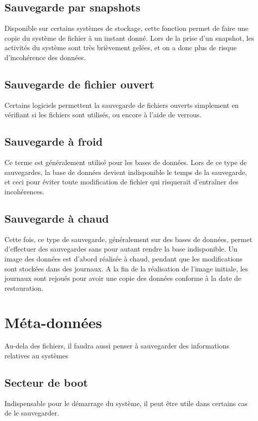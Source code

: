 \documentclass[a4paper,11pt]{report}
\begin{document}
\subsection{Sauvegarde par snapshots}
Disponible sur certains systèmes de stockage, cette fonction permet de faire une copie du système de fichier à un instant donné.
Lors de la prise d'un snapshot, les activités du système sont très brièvement gelées, et on a donc plus de risque d'incohérence des données.

\subsection{Sauvegarde de fichier ouvert}
Certains logiciels permettent la sauvegarde de fichiers ouverts simplement en vérifiant si les fichiers sont utilisés, ou encore à l'aide de verrous.

\subsection{Sauvegarde à froid}
Ce terme est généralement utilisé pour les bases de données.
Lors de ce type de sauvegardes, la base de données devient indisponible le temps de la sauvegarde, et ceci pour éviter toute modification de fichier qui risquerait d'entraîner des incohérences.

\subsection{Sauvegarde à chaud}
Cette fois, ce type de sauvegarde, généralement sur des bases de données, permet d'effectuer des sauvegardes sans pour autant rendre la base indisponible.
Un image des données est d'abord réalisée à chaud, pendant que les modifications sont stockées dans des journaux.
A la fin de la réalisation de l'image initiale, les journaux sont rejoués pour avoir une copie des données conforme à la date de restauration.

\section{Méta-données}
Au-dela des fichiers, il faudra aussi penser à sauvegarder des informations relatives au systèmes

\subsection{Secteur de boot}
Indispensable pour le démarrage du système, il peut être utile dans certains cas de le sauvegarder.
\end{document}
